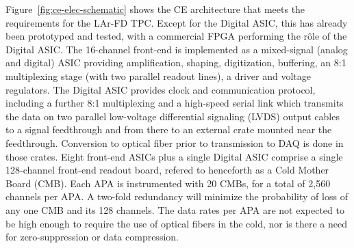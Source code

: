 

Figure~\ref{fig:ce-elec-schematic} shows the CE architecture that meets the requirements for the LAr-FD TPC.
Except for the Digital ASIC, this has already been prototyped and tested,
with a commercial FPGA performing the r\^ole of the Digital ASIC. 
The 16-channel front-end is implemented as a mixed-signal (analog and digital) ASIC
providing amplification, shaping, digitization, buffering,
an 8:1 multiplexing stage (with two parallel readout lines), a driver and voltage regulators.
The Digital ASIC provides clock and communication protocol, including a further 8:1 multiplexing
and a high-speed serial link which transmits the data on two parallel low-voltage differential signaling (LVDS)
output cables to a signal feedthrough and from there to an external crate mounted near the feedthrough.
Conversion to optical fiber prior to transmission to DAQ is done in those crates.
Eight front-end ASICs plus a single Digital ASIC comprise a single 128-channel front-end readout board,
refered to henceforth as a Cold Mother Board (CMB).
Each APA is instrumented with 20 CMBs, for a total of 2,560 channels per APA.
A two-fold redundancy will minimize the probability of loss of any one CMB and its 128 channels.
The data rates per APA are not expected to be high enough to require the use of optical fibers in the cold,
nor is there a need for zero-suppression or data compression.

